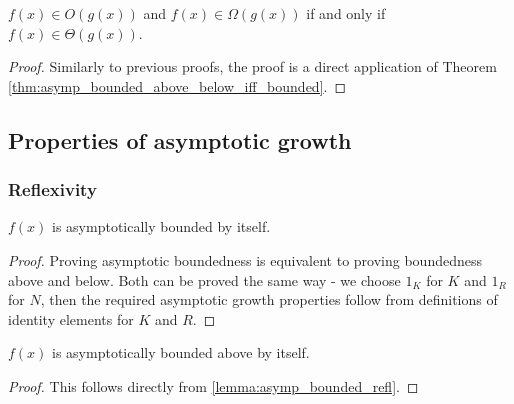 \begin{theorem}
    \label{thm:big_o_and_omega_iff_theta}
    \leanok
    $f(x) \in O(g(x))$ and $f(x) \in \Omega(g(x))$ if and only if $f(x) \in \Theta(g(x))$.
\end{theorem}

\begin{proof}
    \leanok
    Similarly to previous proofs, the proof is a direct application of Theorem 
    \ref{thm:asymp_bounded_above_below_iff_bounded}.
\end{proof}


\subsection{Properties of asymptotic growth}

\subsubsection{Reflexivity}

\begin{lemma}
    \label{lemma:asymp_bounded_refl}
    \leanok
    $f(x)$ is asymptotically bounded by itself. 

\end{lemma}

\begin{proof}
    \leanok
    Proving asymptotic boundedness is equivalent to proving boundedness above and below.
    Both can be proved the same way - we choose $1_K$ for $K$ and $1_R$ for $N$, then the
    required asymptotic growth properties follow from definitions of identity elements for 
    $K$ and $R$.
\end{proof}

\begin{lemma}
    \label{lemma:asymp_bounded_above_refl}
    \leanok
    $f(x)$ is asymptotically bounded above by itself.

\end{lemma}

\begin{proof}
    \leanok
    This follows directly from \ref{lemma:asymp_bounded_refl}.
\end{proof}


